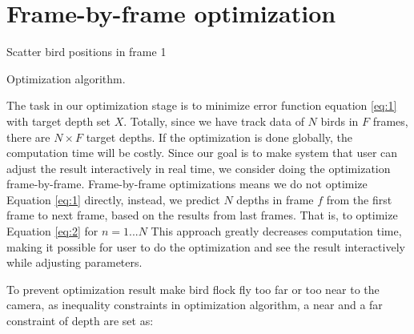 \section{Frame-by-frame optimization}

\begin{algorithm}[h]
\SetAlgoLined
{}
Scatter bird positions in frame 1 \;

\caption{Optimization algorithm.}
\label{algo:optimization}
\end{algorithm}



The task in our optimization stage is to minimize error function equation \ref{eq:1} with target depth set $X$. Totally, since we have track data of $N$ birds in $F$ frames, there are $N{\times}F$ target depths. If the optimization is done globally, the computation time will be costly. Since our goal is to make system that user can adjust the result interactively in real time, we consider doing the optimization frame-by-frame. Frame-by-frame optimizations means we do not optimize Equation \ref{eq:1} directly, instead, we predict $N$ depths in frame $f$ from the first frame to next frame, based on the results from last frames. That is, to optimize Equation \ref{eq:2} for $n=1...N$ This approach greatly decreases computation time, making it possible for user to do the optimization and see the result interactively while adjusting parameters.


To prevent optimization result make bird flock fly too far or too near to the camera, as inequality constraints in optimization algorithm, a near and a far constraint of depth are set as:


